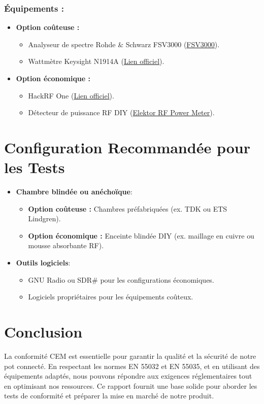 \documentclass[a4paper,12pt]{article}
\begin{document}
\subsubsection*{Équipements :}
\begin{itemize}
    \item \textbf{Option coûteuse :}
          \begin{itemize}
              \item Analyseur de spectre Rohde \& Schwarz FSV3000 (\href{https://www.rohde-schwarz.com/product/FSV3000.html}{FSV3000}).
              \item Wattmètre Keysight N1914A (\href{https://www.keysight.com/us/en/product/N1914A.html}{Lien officiel}).
          \end{itemize}
    \item \textbf{Option économique :}
          \begin{itemize}
              \item HackRF One (\href{https://greatscottgadgets.com/hackrf/one/}{Lien officiel}).
              \item Détecteur de puissance RF DIY (\href{https://www.elektor.com/rf-power-meter}{Elektor RF Power Meter}).
          \end{itemize}
\end{itemize}

\section{Configuration Recommandée pour les Tests}
\begin{itemize}
    \item \textbf{Chambre blindée ou anéchoïque}:
          \begin{itemize}
              \item \textbf{Option coûteuse :} Chambres préfabriquées (ex. TDK ou ETS Lindgren).
              \item \textbf{Option économique :} Enceinte blindée DIY (ex. maillage en cuivre ou mousse absorbante RF).
          \end{itemize}
    \item \textbf{Outils logiciels}:
          \begin{itemize}
              \item GNU Radio ou SDR\# pour les configurations économiques.
              \item Logiciels propriétaires pour les équipements coûteux.
          \end{itemize}
\end{itemize}

\section*{Conclusion}
La conformité CEM est essentielle pour garantir la qualité et la sécurité de notre pot connecté. En respectant les normes EN 55032 et EN 55035, et en utilisant des équipements adaptés, nous pouvons répondre aux exigences réglementaires tout en optimisant nos ressources. Ce rapport fournit une base solide pour aborder les tests de conformité et préparer la mise en marché de notre produit.
\end{document}
